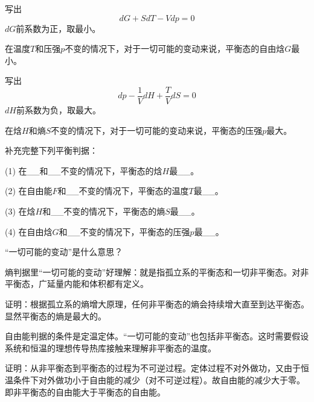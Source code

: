 \documentclass[CJK]{beamer}
\begin{document}
\begin{frame}
\bch
写出
$$dG + S dT - V dp = 0$$
$dG$前系数为正，取最小。

在温度$T$和压强$p$不变的情况下，对于一切可能的变动来说，平衡态的自由焓$G$最小。

\ech
\end{frame}


\begin{frame}
\bch
写出
$$dp - \frac{1}{V} dH + \frac{T}{V} dS = 0$$
$dH$前系数为负，取最大。

在焓$H$和熵$S$不变的情况下，对于一切可能的变动来说，平衡态的压强$p$最大。

\ech
\end{frame}


\begin{frame}
  \bch
  补充完整下列平衡判据：
  \bitem
\item[(1)]{在\_\_和\_\_不变的情况下，平衡态的焓$H$最\_\_。}
\item[(2)]{在自由能$F$和\_\_不变的情况下，平衡态的温度$T$最\_\_。}
\item[(3)]{在焓$H$和\_\_不变的情况下，平衡态的熵$S$最\_\_。}
\item[(4)]{在自由焓$G$和\_\_不变的情况下，平衡态的压强$p$最\_\_。}
  \eitem
  \ech
\end{frame}

\begin{frame}
\bch
“一切可能的变动”是什么意思？

\ech
\end{frame}

\begin{frame}
\bch
熵判据里“一切可能的变动”好理解：就是指孤立系的平衡态和一切非平衡态。对非平衡态，广延量内能和体积都有定义。



证明：根据孤立系的熵增大原理，任何非平衡态的熵会持续增大直至到达平衡态。显然平衡态的熵是最大的。

\ech
\end{frame}


\begin{frame}
\bch
自由能判据的条件是定温定体。“一切可能的变动”也包括非平衡态。这时需要假设系统和恒温的理想传导热库接触来理解非平衡态的温度。


证明：从非平衡态到平衡态的过程为不可逆过程。定体过程不对外做功，又由于恒温条件下对外做功小于自由能的减少（对不可逆过程）。故自由能的减少大于零。即非平衡态的自由能大于平衡态的自由能。

\ech
\end{frame}
\end{document}
